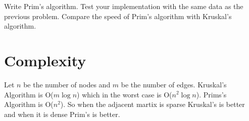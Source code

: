 \begin{problem}
Write Prim's algorithm.
Test your implementation with the same data as the previous problem.
Compare the speed of Prim's algorithm with Kruskal's algorithm. 
\end{problem}

\section*{Complexity}

Let $n$ be the number of nodes and $m$ be the number of edges.
Kruskal's Algorithm is O($m\log{n}$) which in the worst case is O($n^2\log{n}$).
Prims's Algorithm is O($n^2$).
So when the adjacent martix is sparse Kruskal's is better and when it is dense Prim's is better. 